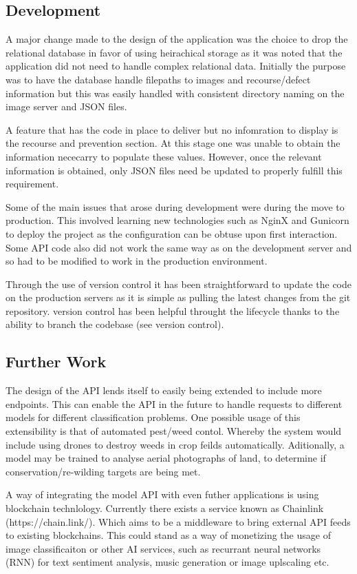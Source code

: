   \subsection{Development}
    A major change made to the design of the application was the choice to drop the relational database in favor of using heirachical storage as it was noted that the application did not need to handle complex relational data. Initially the purpose was to have the database handle filepaths to images and recourse/defect information but this was easily handled with consistent directory naming on the image server and JSON files.
    \par
    A feature that has the code in place to deliver but no infomration to display is the recourse and prevention section. At this stage one was unable to obtain the information nececarry to populate these values. However, once the relevant information is obtained, only JSON files need be updated to properly fulfill this requirement.
    \par
    Some of the main issues that arose during development were during the move to production. This involved learning new technologies such as NginX and Gunicorn to deploy the project as the configuration can be obtuse upon first interaction. Some API code also did not work the same way as on the development server and so had to be modified to work in the production environment.
    \par
    Through the use of version control it has been straightforward to update the code on the production servers as it is simple as pulling the latest changes from the git repository. version control has been helpful throught the lifecycle thanks to the ability to branch the codebase (see version control).

  \subsection{Further Work}
    The design of the API lends itself to easily being extended to include more endpoints. This can enable the API in the future to handle requests to different models for different classification problems. One possible usage of this extensibility is that of automated pest/weed contol. Whereby the system would include using drones to destroy weeds in crop feilds automatically. Aditionally, a model may be trained to analyse aerial photographs of land, to determine if conservation/re-wilding targets are being met.
    \par
    A way of integrating the model API with even futher applications is using blockchain technlology. Currently there exists a service known as Chainlink (https://chain.link/). Which aims to be a middleware to bring external API feeds to existing blockchains. This could stand as a way of monetizing the usage of image classificaiton or other AI services, such as recurrant neural networks (RNN) for text sentiment analysis, music generation or image uplscaling etc.
